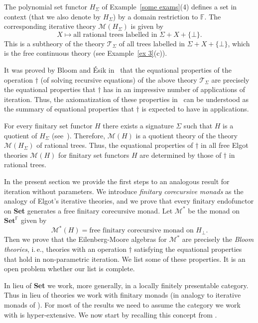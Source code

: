 \documentclass{LMCS}
\theoremstyle{plain}
\theoremstyle{definition}
\numberwithin{equation}{section}
\begin{document}
\begin{exa}
  The polynomial set functor $H_\Sigma$ of Example~\ref{some exams}(4) defines a set in context (that we also denote by $H_\Sigma$) by a domain restriction to $\mathbb F$. The corresponding iterative theory $\mathcal M(H_\Sigma)$ is given by
  \[
  X \mapsto \text{all rational trees labelled in $\Sigma + X +\{\bot\}$}.
  \]
  This is a subtheory of the theory $\mathcal T_\Sigma$ of all trees labelled in $\Sigma + X +\{\bot\}$, which is the free continuous theory (see Example~\ref{ex 3}(c)).
\end{exa}

It was proved by Bloom and \'Esik in~\cite{be} that the equational properties of the operation $\dagger$ (of solving recursive equations) of the above theory $\mathcal T_\Sigma$ are precisely the equational properties that $\dagger$ has in an impressive number of applications of iteration. Thus, the axiomatization of these properties in~\cite{be} can be understood as the summary of equational properties that $\dagger$ is expected to have in applications. 

For every finitary set functor $H$ there exists a signature $\Sigma$ such that $H$ is a quotient of $H_\Sigma$ (see~\cite{at}). Therefore, $\mathcal M(H)$ is a quotient theory of the theory $\mathcal M(H_\Sigma)$ of rational trees. Thus, the equational properties of $\dagger$ in all free Elgot theories $\mathcal M(H)$ for finitary set functors $H$ are determined by those of $\dagger$ in rational trees.

In the present section we provide the first steps to an analogous result for iteration without parameters. We introduce  \emph{finitary corecursive monads} as the analogy of Elgot's iterative theories, and we prove that every finitary endofunctor on {\bf Set} generates a free finitary corecursive monad. Let $\mathcal M^*$ be the monad on $\mathbf{Set}^\mathbb F$ given by
$$\mathcal M^*(H)= \text{free finitary corecursive monad on }H_\bot.$$
Then we prove that the Eilenberg-Moore algebras for $\mathcal M^*$ are precisely the {\it Bloom theories}, i.\,e., theories with an operation $\dagger$ satisfying the equational properties that hold in non-parametric iteration. We list some of these properties. It is an open problem whether our list is complete.

In lieu of {\bf Set} we work, more generally, in a locally finitely presentable category. Thus in lieu of theories we work with finitary monads (in analogy to iterative monads of \cite{elgot}). For most of the results we need to assume the category we work with is hyper-extensive. We now start by recalling this concept from \cite{abmv_how}.
\end{document}
